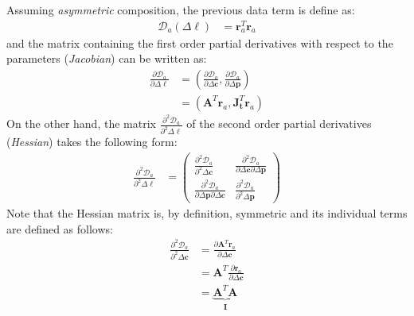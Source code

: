 Assuming \emph{asymmetric} composition, the previous data term is define as:
\begin{equation}
    \begin{aligned}
		\mathcal{D}_a(\Delta \boldsymbol{\ell}) & = \mathbf{r}_a^T \mathbf{r}_a
    \label{eq:asymmetric_data}
    \end{aligned}
\end{equation}
and the matrix containing the first order partial derivatives with respect to the parameters (\emph{Jacobian}) can be written as:
\begin{equation}
    \begin{aligned}
		\frac{\partial \mathcal{D}_a}{\partial \Delta \boldsymbol{\ell}} & = \left( \frac{\partial \mathcal{D}_a}{\partial \Delta \mathbf{c}}, \frac{\partial \mathcal{D}_a}{\partial \Delta \mathbf{p}} \right)
		\\
		& = \left( \mathbf{A}^T \mathbf{r}_a, \mathbf{J}_{\mathbf{t}}^T \mathbf{r}_a \right)
    \label{eq:asymmetric_newton_jacobian}
    \end{aligned}
\end{equation}
On the other hand, the matrix $\frac{\partial^2 \mathcal{D}_a}{\partial^2 \Delta \boldsymbol{\ell}}$ of the second order partial derivatives (\emph{Hessian}) takes the following form: 
\begin{equation}
    \begin{aligned}
		\frac{\partial^2 \mathcal{D}_a}{\partial^2 \Delta \boldsymbol{\ell}} & = 
		\begin{pmatrix}
			\frac{\partial^2 \mathcal{D}_a}{\partial^2 \Delta \mathbf{c}} & \frac{\partial^2 \mathcal{D}_a}{\partial \Delta \mathbf{c} \partial \Delta \mathbf{p}}
			\\
			\frac{\partial^2 \mathcal{D}_a}{\partial \Delta \mathbf{p} \partial \Delta \mathbf{c}} & \frac{\partial^2 \mathcal{D}_a}{\partial^2 \Delta \mathbf{p}}
		\end{pmatrix}
    \label{eq:asymmetric_newton_hessian}
    \end{aligned}
\end{equation}
Note that the Hessian matrix is, by definition, symmetric and its individual terms are defined as follows:
\begin{equation}
    \begin{aligned}
		\frac{\partial^2 \mathcal{D}_a}{\partial^2 \Delta \mathbf{c}} & = \frac{\partial \mathbf{A}^T \mathbf{r}_a}{\partial \Delta \mathbf{c}} 
		\\
		& = \mathbf{A}^T \frac{\partial \mathbf{r}_a}{\partial \Delta \mathbf{c}} 
		\\
		& = \underbrace{\mathbf{A}^T \mathbf{A}}_{\mathbf{I}}
    \label{eq:asymmetric_hessian_term1}
    \end{aligned}
\end{equation}
